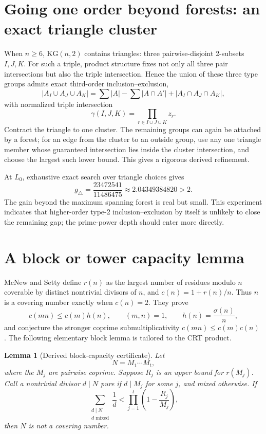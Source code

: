 \documentclass[11pt]{article}
\newtheorem{lemma}[theorem]{Lemma}
\theoremstyle{definition}
\newcommand{\kg}{\mathrm{KG}}
\begin{document}
\section{Going one order beyond forests: an exact triangle cluster}

When $n\ge6$, $\kg(n,2)$ contains triangles: three pairwise-disjoint 2-subsets
$I,J,K$.  For such a triple, product structure fixes not only all three pair intersections but
also the triple intersection.  Hence the union of these three type groups admits exact
third-order inclusion--exclusion,
\[
 |A_I\cup A_J\cup A_K|
 =\sum |A|-\sum |A\cap A'|+|A_I\cap A_J\cap A_K|,
\]
with normalized triple intersection
\[
 \gamma(I,J,K)=\prod_{r\in I\cup J\cup K}z_r.
\]
Contract the triangle to one cluster.  The remaining groups can again be attached by a forest;
for an edge from the cluster to an outside group, use any one triangle member whose guaranteed
intersection lies inside the cluster intersection, and choose the largest such lower bound.
This gives a rigorous derived refinement.

At $L_0$, exhaustive exact search over triangle choices gives
\[
 g_{\triangle}=\frac{23472541}{11486475}
 \approx2.04349384820>2.
\]
The gain beyond the maximum spanning forest is real but small.  This experiment indicates that
higher-order type-2 inclusion--exclusion by itself is unlikely to close the remaining gap; the
prime-power depth should enter more directly.

\section{A block or tower capacity lemma}

McNew and Setty define $r(n)$ as the largest number of residues modulo $n$ coverable by distinct
nontrivial divisors of $n$, and $c(n)=1+r(n)/n$.  Thus $n$ is a covering number exactly when
$c(n)=2$.  They prove
\[
 c(mn)\le c(m)h(n),\qquad (m,n)=1,
 \qquad h(n)=\frac{\sigma(n)}n,
\]
and conjecture the stronger coprime submultiplicativity $c(mn)\le c(m)c(n)$
\cite{McNewSetty2026}.  The following elementary block lemma is tailored to the CRT product.

\begin{lemma}[Derived block-capacity certificate]\label{lem:block}
Let
\[
 N=M_1\cdots M_t,
\]
where the $M_j$ are pairwise coprime.  Suppose $R_j$ is an upper bound for $r(M_j)$.  Call a
nontrivial divisor $d\mid N$ \emph{pure} if $d\mid M_j$ for some $j$, and \emph{mixed}
otherwise.  If
\begin{equation}\label{eq:blockcertificate}
 \sum_{\substack{d\mid N\\d\text{ mixed}}}\frac1d
 <
 \prod_{j=1}^{t}\left(1-\frac{R_j}{M_j}\right),
\end{equation}
then $N$ is not a covering number.
\end{lemma}
\end{document}
